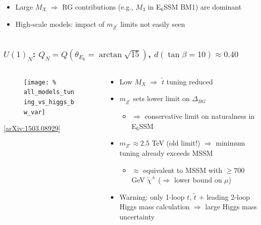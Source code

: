 \documentclass[10pt,aspectratio=169]{beamer}
\begin{document}
\begin{frame}
\begin{columns}
\begin{column}{0.5\textwidth}
\begin{figure}
\begin{center}
        \end{center}
      \end{figure}
      \begin{itemize} \itemsep1em
        \item Large $M_X$ $\Rightarrow$ RG contributions (e.g., $M_3$ in
          E$_6$SSM BM1) are dominant
        \item High-scale models: impact of $m_{Z^\prime}$ limits not easily
          seen
      \end{itemize}
    \end{column}
  \end{columns}
\end{frame}

\begin{frame}
  \frametitle{$U(1)_N$: $Q_N = Q(\theta_{E_6} = \arctan \sqrt{15})$,
    $d(\tan\beta = 10) \approx 0.40$}
  \begin{columns}
    \begin{column}{0.5\textwidth}
      \vspace*{-15pt}
      \begin{figure}
        \texttt{[image: \%
          all\_models\_tuning\_vs\_higgs\_bw\_var]}
      \end{figure}
      \begin{center}
        \tiny [\href{https://arxiv.org/abs/1503.08929}{arXiv:1503.08929}]
      \end{center}
    \end{column}
    \begin{column}{0.5\textwidth}
      \begin{itemize} \itemsep1.5em
        \item Low $M_X$ $\Rightarrow$ $\tilde{t}$ tuning reduced
        \item {\color{blue} $m_{Z^\prime}$ sets lower limit on $\Delta_{BG}$}
          \begin{itemize}
            \item $\Rightarrow$ conservative limit on naturalness in E$_6$SSM
          \end{itemize}
        \item $m_{Z'} \approx 2.5$ TeV (\alert{old limit!})
          $\Rightarrow$ minimum tuning already exceeds MSSM
          \begin{itemize}
            \item $\approx$ equivalent to MSSM with $\geq 700$ GeV
              $\tilde{\chi}^\pm$ ($\Rightarrow$ lower bound on $\mu$)
          \end{itemize}
        \item \alert{Warning: only 1-loop $t$, $\tilde{t}$ + leading 2-loop
            Higgs mass calculation $\Rightarrow$ large Higgs mass uncertainty}
      \end{itemize}
    \end{column}
  \end{columns}
\end{frame}
\end{document}
